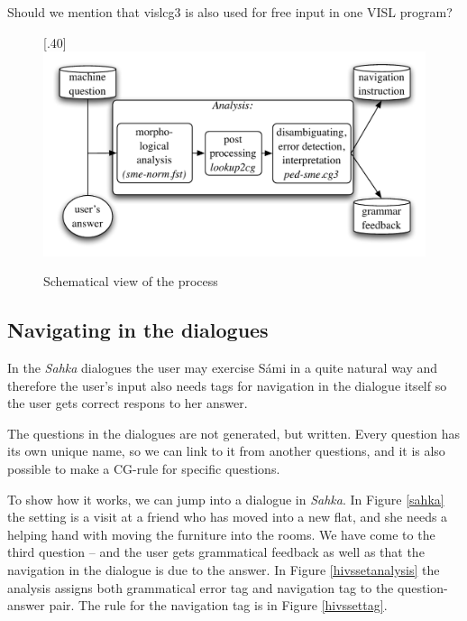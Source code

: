 \documentclass[11pt]{article}
\begin{document}
Should we mention that vislcg3 is also used for free input in one VISL program?

\begin{figure}%
\begin{center}
\scalebox{.40}[.40]{\includegraphics{presentation/img/qa2.pdf}}\\
\caption{Schematical view of the process}
\end{center}
\end{figure}


\subsection{Navigating in the dialogues}
In the \textit{Sahka} dialogues the user may exercise Sámi in a quite natural way and therefore the user's input also needs tags for navigation in the dialogue itself so the user gets correct respons to her answer.

The questions in the dialogues are not generated, but written. Every question has its own unique name, so we can link to it from another questions, and it is also possible to make a CG-rule for specific questions.  

To show how it works, we can jump into a dialogue in \textit{Sahka}. In Figure \ref{sahka} the setting is a visit at a friend who has moved into a new flat, and she needs a helping hand with moving the furniture into the rooms. We have come to the third question – and the user gets grammatical feedback as well as that the navigation in the dialogue is due to the answer. In Figure \ref{hivssetanalysis} the analysis assigns both grammatical error tag and navigation tag to the question-answer pair. The rule for the navigation tag is in Figure \ref{hivssettag}.
 
\end{document}
